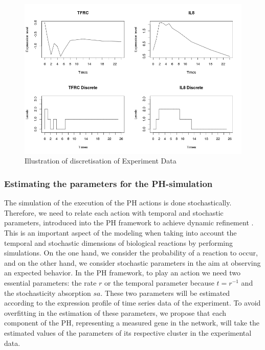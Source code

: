 \documentclass[11pt,a4paper,twoside]{epig}
\begin{document}
\begin{figure}
 \centering
 \includegraphics[scale=0.3]{IllustrationDiscretisation.png}
 \caption{Illustration of discretisation of Experiment Data }
 \label{fig:illustrationDiscretisation}
\end{figure}



\subsubsection{Estimating the parameters for the PH-simulation}

The simulation of the execution of the PH actions is done stochastically.  Therefore, we need to relate each action with temporal 
and stochastic parameters, introduced into the PH framework to achieve dynamic refinement \cite{PMR10-TCSB}. 
This is an important aspect of the modeling when taking into account the temporal and stochastic dimensions of 
biological reactions by performing simulations. 
On the one hand, we consider the probability of a reaction to occur, and on the other hand, we 
consider stochastic parameters in the aim at observing an expected behavior. 
In the PH framework, to play an action we need two essential parameters: the rate $r$ or the temporal parameter because $t=r^{-1}$ 
and the stochasticity absorption $sa$. These two parameters will be estimated according to the expression profile of time series data of the experiment. 
To avoid overfitting in the estimation of these parameters, we propose that each component of the PH, representing a measured gene in the network,  will take the estimated values of the parameters of its respective cluster in the experimental data.
\end{document}

